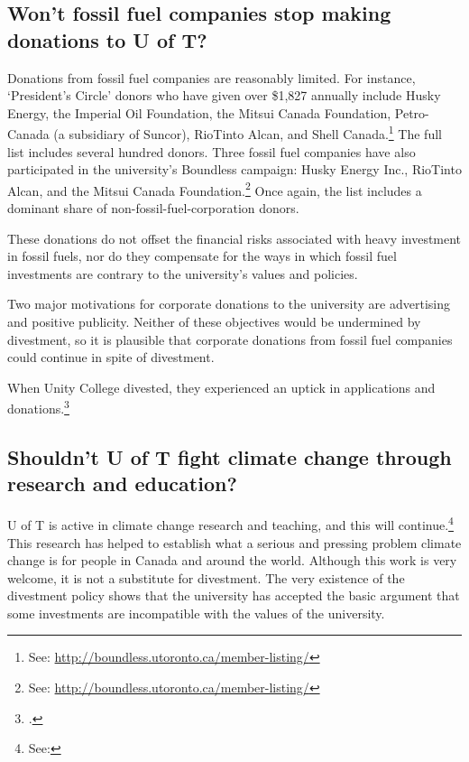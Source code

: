 \documentclass[10pt]{article}
\begin{document}
	\subsection{Won't fossil fuel companies stop making donations to U of T?}
	\label{NoMoreDonations}



Donations from fossil fuel companies are reasonably limited. 
For instance, `President's Circle' donors who have given over \$1,827 annually include Husky Energy, the Imperial Oil Foundation, the Mitsui Canada Foundation, Petro-Canada (a subsidiary of Suncor), RioTinto Alcan, and Shell Canada.\footnote{See: \url{http://boundless.utoronto.ca/member-listing/}}
The full list includes several hundred donors.
Three fossil fuel companies have also participated in the university's Boundless campaign: Husky Energy Inc., RioTinto Alcan, and the Mitsui Canada Foundation.\footnote{See: \url{http://boundless.utoronto.ca/member-listing/}}
Once again, the list includes a dominant share of non-fossil-fuel-corporation donors.



These donations do not offset the financial risks associated with heavy investment in fossil fuels, nor do they compensate for the ways in which fossil fuel investments are contrary to the university's values and policies.



Two major motivations for corporate donations to the university are advertising and positive publicity.
Neither of these objectives would be undermined by divestment, so it is plausible that corporate donations from fossil fuel companies could continue in spite of divestment.



When Unity College divested, they experienced an uptick in applications and donations.\footcite[][p. 4]{CaseForDivestment}



	\subsection{Shouldn't U of T fight climate change through research and education?}
	\label{ResearchEducation}



U of T is active in climate change research and teaching, and this will continue.\footnote{See: }
This research has helped to establish what a serious and pressing problem climate change is for people in Canada and around the world.
Although this work is very welcome, it is not a substitute for divestment.
The very existence of the divestment policy shows that the university has accepted the basic argument that some investments are incompatible with the values of the university.
\end{document}
